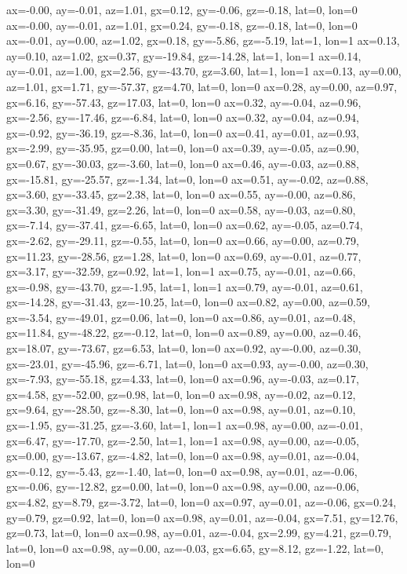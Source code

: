 ax=-0.00, ay=-0.01, az=1.01, gx=0.12, gy=-0.06, gz=-0.18, lat=0, lon=0
ax=-0.00, ay=-0.01, az=1.01, gx=0.24, gy=-0.18, gz=-0.18, lat=0, lon=0
ax=-0.01, ay=0.00, az=1.02, gx=0.18, gy=-5.86, gz=-5.19, lat=1, lon=1
ax=0.13, ay=0.10, az=1.02, gx=0.37, gy=-19.84, gz=-14.28, lat=1, lon=1
ax=0.14, ay=-0.01, az=1.00, gx=2.56, gy=-43.70, gz=3.60, lat=1, lon=1
ax=0.13, ay=0.00, az=1.01, gx=1.71, gy=-57.37, gz=4.70, lat=0, lon=0
ax=0.28, ay=0.00, az=0.97, gx=6.16, gy=-57.43, gz=17.03, lat=0, lon=0
ax=0.32, ay=-0.04, az=0.96, gx=-2.56, gy=-17.46, gz=-6.84, lat=0, lon=0
ax=0.32, ay=0.04, az=0.94, gx=-0.92, gy=-36.19, gz=-8.36, lat=0, lon=0
ax=0.41, ay=0.01, az=0.93, gx=-2.99, gy=-35.95, gz=0.00, lat=0, lon=0
ax=0.39, ay=-0.05, az=0.90, gx=0.67, gy=-30.03, gz=-3.60, lat=0, lon=0
ax=0.46, ay=-0.03, az=0.88, gx=-15.81, gy=-25.57, gz=-1.34, lat=0, lon=0
ax=0.51, ay=-0.02, az=0.88, gx=3.60, gy=-33.45, gz=2.38, lat=0, lon=0
ax=0.55, ay=-0.00, az=0.86, gx=3.30, gy=-31.49, gz=2.26, lat=0, lon=0
ax=0.58, ay=-0.03, az=0.80, gx=-7.14, gy=-37.41, gz=-6.65, lat=0, lon=0
ax=0.62, ay=-0.05, az=0.74, gx=-2.62, gy=-29.11, gz=-0.55, lat=0, lon=0
ax=0.66, ay=0.00, az=0.79, gx=11.23, gy=-28.56, gz=1.28, lat=0, lon=0
ax=0.69, ay=-0.01, az=0.77, gx=3.17, gy=-32.59, gz=0.92, lat=1, lon=1
ax=0.75, ay=-0.01, az=0.66, gx=-0.98, gy=-43.70, gz=-1.95, lat=1, lon=1
ax=0.79, ay=-0.01, az=0.61, gx=-14.28, gy=-31.43, gz=-10.25, lat=0, lon=0
ax=0.82, ay=0.00, az=0.59, gx=-3.54, gy=-49.01, gz=0.06, lat=0, lon=0
ax=0.86, ay=0.01, az=0.48, gx=11.84, gy=-48.22, gz=-0.12, lat=0, lon=0
ax=0.89, ay=0.00, az=0.46, gx=18.07, gy=-73.67, gz=6.53, lat=0, lon=0
ax=0.92, ay=-0.00, az=0.30, gx=-23.01, gy=-45.96, gz=-6.71, lat=0, lon=0
ax=0.93, ay=-0.00, az=0.30, gx=-7.93, gy=-55.18, gz=4.33, lat=0, lon=0
ax=0.96, ay=-0.03, az=0.17, gx=4.58, gy=-52.00, gz=0.98, lat=0, lon=0
ax=0.98, ay=-0.02, az=0.12, gx=9.64, gy=-28.50, gz=-8.30, lat=0, lon=0
ax=0.98, ay=0.01, az=0.10, gx=-1.95, gy=-31.25, gz=-3.60, lat=1, lon=1
ax=0.98, ay=0.00, az=-0.01, gx=6.47, gy=-17.70, gz=-2.50, lat=1, lon=1
ax=0.98, ay=0.00, az=-0.05, gx=0.00, gy=-13.67, gz=-4.82, lat=0, lon=0
ax=0.98, ay=0.01, az=-0.04, gx=-0.12, gy=-5.43, gz=-1.40, lat=0, lon=0
ax=0.98, ay=0.01, az=-0.06, gx=-0.06, gy=-12.82, gz=0.00, lat=0, lon=0
ax=0.98, ay=0.00, az=-0.06, gx=4.82, gy=8.79, gz=-3.72, lat=0, lon=0
ax=0.97, ay=0.01, az=-0.06, gx=0.24, gy=0.79, gz=0.92, lat=0, lon=0
ax=0.98, ay=0.01, az=-0.04, gx=7.51, gy=12.76, gz=0.73, lat=0, lon=0
ax=0.98, ay=0.01, az=-0.04, gx=2.99, gy=4.21, gz=0.79, lat=0, lon=0
ax=0.98, ay=0.00, az=-0.03, gx=6.65, gy=8.12, gz=-1.22, lat=0, lon=0
